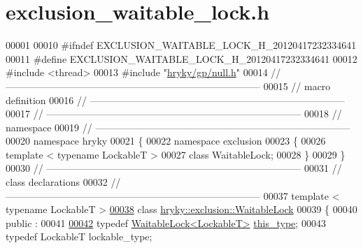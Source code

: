 \hypertarget{exclusion__waitable__lock_8h_source}{\section{exclusion\-\_\-waitable\-\_\-lock.\-h}
}

\begin{DoxyCode}
00001 
00010 \textcolor{preprocessor}{#ifndef EXCLUSION\_WAITABLE\_LOCK\_H\_20120417232334641}
00011 \textcolor{preprocessor}{}\textcolor{preprocessor}{#define EXCLUSION\_WAITABLE\_LOCK\_H\_20120417232334641}
00012 \textcolor{preprocessor}{}\textcolor{preprocessor}{#include <thread>}
00013 \textcolor{preprocessor}{#include "\hyperlink{null_8h}{hryky/gp/null.h}"}
00014 \textcolor{comment}{//
      ------------------------------------------------------------------------------}
00015 \textcolor{comment}{// macro definition}
00016 \textcolor{comment}{//
      ------------------------------------------------------------------------------}
00017 \textcolor{comment}{//
      ------------------------------------------------------------------------------}
00018 \textcolor{comment}{// namespace}
00019 \textcolor{comment}{//
      ------------------------------------------------------------------------------}
00020 \textcolor{keyword}{namespace }hryky
00021 \{
00022 \textcolor{keyword}{namespace }exclusion
00023 \{
00026     \textcolor{keyword}{template} < \textcolor{keyword}{typename} LockableT >
00027     \textcolor{keyword}{class }WaitableLock;
00028 \}
00029 \}
00030 \textcolor{comment}{//
      ------------------------------------------------------------------------------}
00031 \textcolor{comment}{// class declarations}
00032 \textcolor{comment}{//
      ------------------------------------------------------------------------------}
00037 \textcolor{comment}{}\textcolor{keyword}{template} < \textcolor{keyword}{typename} LockableT >
\hypertarget{exclusion__waitable__lock_8h_source_l00038}{}\hyperlink{classhryky_1_1exclusion_1_1_waitable_lock}{00038} \textcolor{keyword}{class }\hyperlink{classhryky_1_1exclusion_1_1_waitable_lock}{hryky::exclusion::WaitableLock}
00039 \{
00040 \textcolor{keyword}{public} :
00041 
\hypertarget{exclusion__waitable__lock_8h_source_l00042}{}\hyperlink{classhryky_1_1exclusion_1_1_waitable_lock_ac04c20cbf4a51c9dac3ae485ff40c723}{00042}     \textcolor{keyword}{typedef} \hyperlink{classhryky_1_1exclusion_1_1_waitable_lock}{WaitableLock<LockableT>} \hyperlink{classhryky_1_1exclusion_1_1_waitable_lock_ac04c20cbf4a51c9dac3ae485ff40c723}{this_type};
00043     \textcolor{keyword}{typedef} LockableT               lockable\_type;

\end{DoxyCode}
